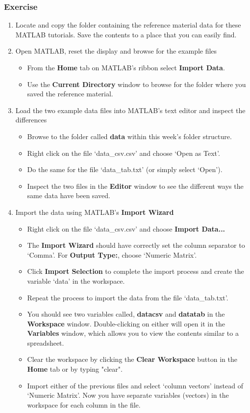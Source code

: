 \documentclass[12pt,a4paper]{article}
\begin{document}
\subsubsection*{Exercise}
\begin{enumerate}
	\item Locate and copy the folder containing the reference material data for these MATLAB tutorials.  Save the contents to a place that you can easily find. 
	\item Open MATLAB, reset the display and browse for the example files
	\begin{itemize}
		\item From the \textbf{Home} tab on MATLAB's ribbon select \textbf{Import Data}.
		\item Use the \textbf{Current Directory} window to browse for the folder where you saved the reference material.
	\end{itemize}
	\item Load the two example data files into MATLAB's text editor and inspect the differences
	\begin{itemize}	
		\item Browse to the folder called \textbf{data} within this week's folder structure.
		\item Right click on the file `data\_csv.csv' and choose `Open as Text'.
		\item Do the same for the file `data\_tab.txt' (or simply select `Open').
		\item Inspect the two files in the \textbf{Editor} window to see the different ways the same data have been saved.		
	\end{itemize}
	\item Import the data using MATLAB's \textbf{Import Wizard}
	\begin{itemize}	
		\item Right click on the file `data\_csv.csv' and choose \textbf{Import Data...}
		\item The \textbf{Import Wizard} should have correctly set the column separator to `Comma'. For \textbf{Output Type:}, choose `Numeric Matrix'.
		\item Click \textbf{Import Selection} to complete the import process and create the variable `data' in the workspace.
		\item Repeat the process to import the data from the file `data\_tab.txt'.
		\item You should see two variables called, \textbf{datacsv} and \textbf{datatab} in the \textbf{Workspace} window. Double-clicking on either will open it in the \textbf{Variables} window, which allows you to view the contents similar to a spreadsheet.
		\item Clear the workspace by clicking the \textbf{Clear Workspace} button in the \textbf{Home} tab or by typing "clear".
		\item Import either of the previous files and select `column vectors' instead of `Numeric Matrix'. Now you have separate variables (vectors) in the workspace for each column in the file.
	\end{itemize}
\end{enumerate}
\end{document}
